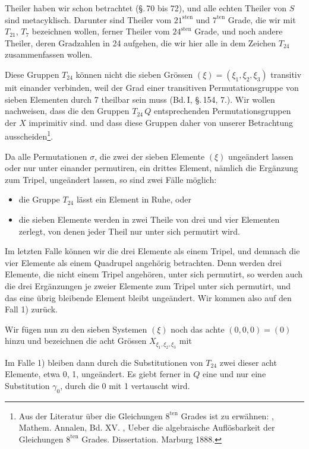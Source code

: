 Theiler haben wir schon betrachtet (\S.\,70 bis 72), und alle echten Theiler von $S$ sind metacyklisch. Darunter sind Theiler vom $21^{\mathrm{sten}}$ und $7^{\mathrm{ten}}$ Grade, die wir mit $T_{21}$, $T_7$ bezeichnen wollen, ferner Theiler vom $24^{\mathrm{sten}}$ Grade, und noch andere Theiler, deren Gradzahlen in 24 aufgehen, die wir hier alle in dem Zeichen $T_{24}$ zusammenfassen wollen.

Diese Gruppen $T_{24}$ können nicht die sieben Grössen $(\xi) = (\xi_1, \xi_2, \xi_3)$ transitiv mit einander verbinden, weil der Grad einer transitiven Permutationsgruppe von sieben Elementen durch 7 theilbar sein muss (Bd.\,I, \S.\,154, 7.). Wir wollen nachweisen, dass die den Gruppen $T_{24}\,Q$ entsprechenden Permutationsgruppen der $X$ imprimitiv sind. %
und dass diese Gruppen daher von unserer Betrachtung ausscheiden\footnote{Aus der Literatur über die Gleichungen $8^{\mathrm{ten}}$ Grades ist zu erwähnen: , Mathem. Annalen, Bd. XV. , Ueber die algebraische Auflösbarkeit der Gleichungen $8^{\mathrm{ten}}$ Grades. Dissertation. Marburg 1888.}.

Da alle Permutationen $\sigma$, die zwei der sieben Elemente $(\xi)$ ungeändert lassen oder nur unter einander permutiren, ein drittes Element, nämlich die Ergänzung zum Tripel, ungeändert lassen, so sind zwei Fälle möglich:

\begin{itemize}
\item[1)] die Gruppe $T_{24}$ lässt ein Element in Ruhe, oder
\item[2)] die sieben Elemente werden in zwei Theile von drei und vier Elementen zerlegt, von denen jeder Theil nur unter sich permutirt wird.
\end{itemize}

Im letzten Falle können wir die drei Elemente als einem Tripel, und demnach die vier Elemente als einem Quadrupel angehörig betrachten. Denn werden drei Elemente, die nicht einem Tripel angehören, unter sich permutirt, so werden auch die drei Ergänzungen je zweier Elemente zum Tripel unter sich permutirt, und das eine übrig bleibende Element bleibt ungeändert. Wir kommen also auf den Fall 1) zurück.

Wir fügen nun zu den sieben Systemen $(\xi)$ noch das achte $(0,0,0) = (0)$ hinzu und bezeichnen die acht Grössen $X_{\xi_1, \xi_2, \xi_3}$ mit


Im Falle 1) bleiben dann durch die Substitutionen von $T_{24}$ zwei dieser acht Elemente, etwa 0, 1, ungeändert. Es giebt ferner in $Q$ eine und nur eine Substitution $\gamma_0$, durch die 0 mit 1 vertauscht wird.
